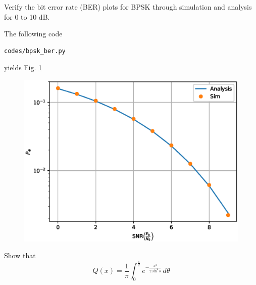 \documentclass[journal,12pt,twocolumn]{IEEEtran}
\begin{document}
\begin{problem}
Verify the bit error rate (BER) plots for BPSK through simulation and analysis for 0 to 10 dB.
\end{problem}
\solution
The following code
\begin{lstlisting}
codes/bpsk_ber.py
\end{lstlisting}
yields Fig. \ref{fig:bpsk_ber}
\begin{figure}[!h]
\centering
\includegraphics[width=\columnwidth]{./figs/bpsk_ber.eps}
\caption{}
\label{fig:bpsk_ber}
\end{figure}

\begin{problem}
Show that
\begin{equation}
Q(x) = \frac{1}{\pi}\int^{\frac{\pi}{2}}_{0}e^{-\frac{x^2}{2\sin^2 \theta}}\,d\theta
\end{equation}
\end{problem}
\end{document}
